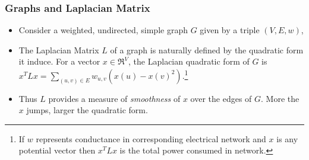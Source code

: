 \documentclass[10pt,sans,serif,trans]{beamer}
\begin{document}
\begin{frame}
  \frametitle{Graphs and Laplacian Matrix}
\begin{definition}
\begin{itemize}
  \item Consider a weighted, undirected, simple graph $G$ given by a triple
$(V,E,w)$,
\item  The Laplacian Matrix $L$ of a graph is naturally defined by the
quadratic form it induce. For a vector  $x \in \Re^{V}$, the Laplacian
quadratic form of $G$ is $x^TLx=\sum_{(u,v)\in E} w_{u,v}(x(u) -
x(v)^2)$.\footnote{If $w$ represents conductance in corresponding electrical network and $x$ is any
potential vector then $x^TLx$ is the total power consumed in network.}
\item Thus $L$ provides a measure of \textit{smoothness} of $x$ over the
edges of $G$. More the $x$ jumps, larger the quadratic form.
\end{itemize}
\end{definition}
\end{frame}
\end{document}
